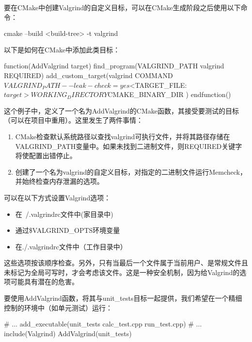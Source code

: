 要在CMake中创建Valgrind的自定义目标，可以在CMake生成阶段之后使用以下命令：

\begin{shell}
cmake --build <build-tree> -t valgrind
\end{shell}

以下是如何在CMake中添加此类目标：


\begin{cmake}
function(AddValgrind target)
    find_program(VALGRIND_PATH valgrind REQUIRED)
    add_custom_target(valgrind
        COMMAND ${VALGRIND_PATH} --leak-check=yes
        $<TARGET_FILE:${target}>
        WORKING_DIRECTORY ${CMAKE_BINARY_DIR}
    )
endfunction()
\end{cmake}

这个例子中，定义了一个名为AddValgrind的CMake函数，其接受要测试的目标（可以在项目中重用）。这里发生了两件事情：

\begin{enumerate}
\item
CMake检查默认系统路径以查找valgrind可执行文件，并将其路径存储在VALGRIND\_PATH变量中。如果未找到二进制文件，则REQUIRED关键字将使配置出错停止。

\item
创建了一个名为valgrind的自定义目标，对指定的二进制文件运行Memcheck，并始终检查内存泄漏的选项。
\end{enumerate}

可以在以下方式设置Valgrind选项：

\begin{itemize}
\item
在~/.valgrindrc文件中(家目录中)

\item
通过\$VALGRIND\_OPTS环境变量

\item
在./.valgrindrc文件中（工作目录中）
\end{itemize}

这些选项按该顺序检查。另外，只有当最后一个文件属于当前用户、是常规文件且未标记为全局可写时，才会考虑该文件。这是一种安全机制，因为给Valgrind的选项可能具有潜在的危害。

要使用AddValgrind函数，将其与unit\_tests目标一起提供，我们希望在一个精细控制的环境中（如单元测试）运行：


\begin{cmake}
# ...
add_executable(unit_tests calc_test.cpp run_test.cpp)
# ...
include(Valgrind)
AddValgrind(unit_tests)
\end{cmake}

